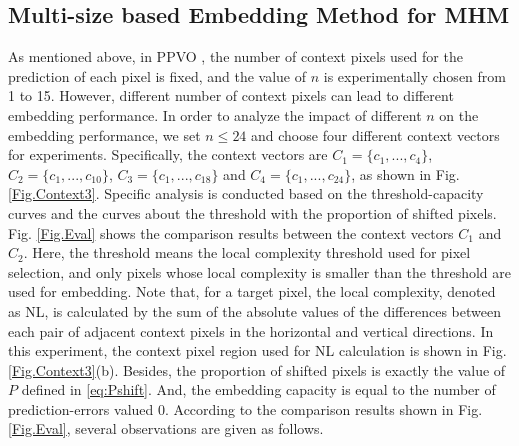 \documentclass[review,3p,10pt,sort&compress]{elsarticle}
\begin{document}
\subsection{Multi-size based Embedding Method for MHM}\label{sec:3.2}
As mentioned above, in PPVO \cite{Qu2015PPVO}, the number of context pixels used for the prediction of each pixel is fixed, and the value of $n$ is experimentally chosen from 1 to 15. However, different number of context pixels can lead to different embedding performance. In order to analyze the impact of different $n$ on the embedding performance, we set $n\leq 24$ and choose four different context vectors for experiments. Specifically, the context vectors are $C_1 = \{c_1, ..., c_4\}$, $C_2 = \{c_1, ..., c_{10}\}$, $C_3 = \{c_1, ..., c_{18}\}$ and $C_4 = \{c_1, ..., c_{24}\}$, as shown in Fig. \ref{Fig.Context3}. Specific analysis is conducted based on the threshold-capacity curves and the curves about the threshold with the proportion of shifted pixels. Fig. \ref{Fig.Eval} shows the comparison results between the context vectors $C_1$ and $C_2$. Here, the threshold means the local complexity threshold used for pixel selection, and only pixels whose local complexity is smaller than the threshold are used for embedding. Note that, for a target pixel, the local complexity, denoted as NL, is calculated by the sum of the absolute values of the differences between each pair of adjacent context pixels in the horizontal and vertical directions. In this experiment, the context pixel region used for NL calculation is shown in Fig. \ref{Fig.Context3}(b). Besides, the proportion of shifted pixels is exactly the value of $P$ defined in \eqref{eq:Pshift}. And, the embedding capacity is equal to the number of prediction-errors valued 0. According to the comparison results shown in Fig. \ref{Fig.Eval}, several observations are given as follows.

\end{document}
